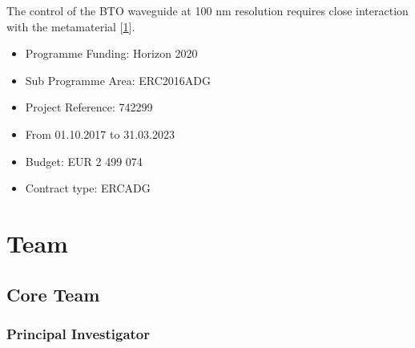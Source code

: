 \documentclass[a4paper,10pt,english,openany,oneside]{jupyterBook}
\begin{document}
\begin{DUlineblock}{0em}
\item[] 
\end{DUlineblock}

\begin{DUlineblock}{0em}
\item[] 
\end{DUlineblock}

\sphinxAtStartPar
The control of the BTO waveguide at 100 nm resolution requires close interaction with the metamaterial {[}\hyperlink{cite.bib:id4}{1}{]}.

\begin{DUlineblock}{0em}
\item[] 
\end{DUlineblock}
\begin{itemize}
\item {} 
\sphinxAtStartPar
Programme Funding: Horizon 2020

\item {} 
\sphinxAtStartPar
Sub Programme Area: ERC\sphinxhyphen{}2016\sphinxhyphen{}ADG

\item {} 
\sphinxAtStartPar
Project Reference: 742299

\item {} 
\sphinxAtStartPar
From 01.10.2017 to 31.03.2023

\item {} 
\sphinxAtStartPar
Budget: EUR 2 499 074

\item {} 
\sphinxAtStartPar
Contract type: ERC\sphinxhyphen{}ADG

\end{itemize}

\sphinxstepscope


\chapter{Team}
\label{\detokenize{Team:team}}\label{\detokenize{Team::doc}}

\section{Core Team}
\label{\detokenize{Team:core-team}}

\subsection{Principal Investigator}
\label{\detokenize{Team:principal-investigator}}
\end{document}
